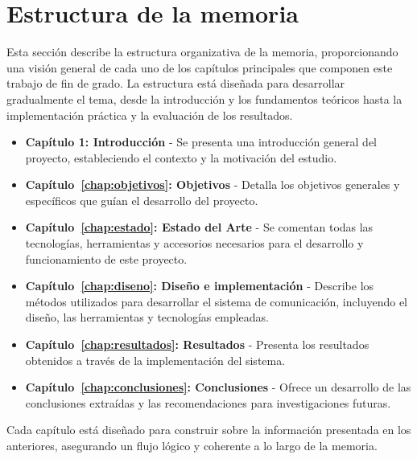 \documentclass[a4paper, 12pt]{book}
\begin{document}
\section{Estructura de la memoria}
\label{sec:estructura}
Esta sección describe la estructura organizativa de la memoria, proporcionando una visión 
general de cada uno de los capítulos principales que componen este trabajo de fin de grado. 
La estructura está diseñada para desarrollar gradualmente el tema, desde la introducción y 
los fundamentos teóricos hasta la implementación práctica y la evaluación de los resultados.

\begin{itemize}
  \item \textbf{Capítulo 1: Introducción} - Se presenta una introducción general del proyecto, estableciendo el contexto y 
  la motivación del estudio.
  
  \item \textbf{Capítulo~\ref{chap:objetivos}: Objetivos} - Detalla los objetivos generales y específicos que guían el desarrollo del proyecto.
  
  \item \textbf{Capítulo~\ref{chap:estado}: Estado del Arte} - Se comentan todas las tecnologías, herramientas y accesorios necesarios
 para el desarrollo y funcionamiento de este proyecto.
  
  \item \textbf{Capítulo~\ref{chap:diseno}: Diseño e implementación} - Describe los métodos utilizados para desarrollar el sistema de comunicación, 
  incluyendo el diseño, las herramientas y tecnologías empleadas.
  
  \item \textbf{Capítulo~\ref{chap:resultados}: Resultados} - Presenta los resultados obtenidos a través de la implementación del sistema.
  
  \item \textbf{Capítulo~\ref{chap:conclusiones}: Conclusiones} - Ofrece un desarrollo de las conclusiones extraídas y 
  las recomendaciones para investigaciones futuras.
\end{itemize}

Cada capítulo está diseñado para construir sobre la información presentada en los anteriores, asegurando un 
flujo lógico y coherente a lo largo de la memoria.




\end{document}
